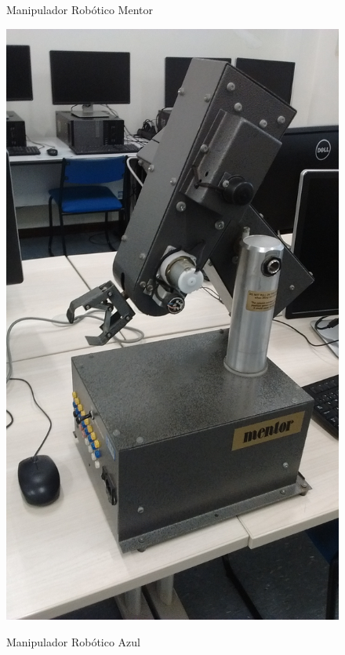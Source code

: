 \begin{figure}[H]
    \begin{minipage}{.5\textwidth}
        \centering
        \caption{Manipulador Robótico Mentor}
        \includegraphics[keepaspectratio=true, width=0.9\linewidth]
            {img/foto-manipulador-preto.jpg}
        \label{fig:fotoManipuladorMentor}
    \end{minipage}
    \begin{minipage}{.5\textwidth}
        \centering
        \caption{Manipulador Robótico Azul}

\end{minipage}
\end{figure}
